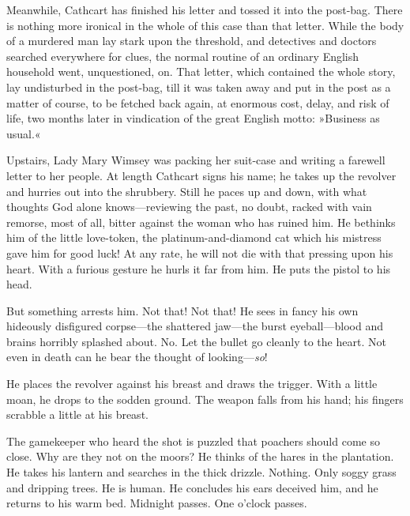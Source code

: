 \begin{dialogue}
\smallskip

Meanwhile, Cathcart has finished his letter and tossed it into the post-bag. There is nothing more ironical in the whole of this case than that letter. While the body of a murdered man lay stark upon the threshold, and detectives and doctors searched everywhere for clues, the normal routine of an ordinary English household went, unquestioned, on. That letter, which contained the whole story, lay undisturbed in the post-bag, till it was taken away and put in the post as a matter of course, to be fetched back again, at enormous cost, delay, and risk of life, two months later in vindication of the great English motto: »Business as usual.«

\smallskip

Upstairs, Lady Mary Wimsey was packing her suit-case and writing a farewell letter to her people. At length Cathcart signs his name; he takes up the revolver and hurries out into the shrubbery. Still he paces up and down, with what thoughts God alone knows—reviewing the past, no doubt, racked with vain remorse, most of all, bitter against the woman who has ruined him. He bethinks him of the little love-token, the platinum-and-diamond cat which his mistress gave him for good luck! At any rate, he will not die with that pressing upon his heart. With a furious gesture he hurls it far from him. He puts the pistol to his head.

\smallskip

But something arrests him. Not that! Not that! He sees in fancy his own hideously disfigured corpse—the shattered jaw—the burst eyeball—blood and brains horribly splashed about. No. Let the bullet go cleanly to the heart. Not even in death can he bear the thought of looking—\textit{so}!

\smallskip

He places the revolver against his breast and draws the trigger. With a little moan, he drops to the sodden ground. The weapon falls from his hand; his fingers scrabble a little at his breast.

\smallskip

The gamekeeper who heard the shot is puzzled that poachers should come so close. Why are they not on the moors? He thinks of the hares in the plantation. He takes his lantern and searches in the thick drizzle. Nothing. Only soggy grass and dripping trees. He is human. He concludes his ears deceived him, and he returns to his warm bed. Midnight passes. One o'clock passes.

\smallskip


\end{dialogue}
